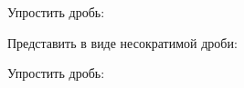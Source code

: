 \begin{listofex}
	\item Упростить дробь:
	\begin{enumcols}[itemcolumns=2]
		\item {}
		\item {}
		\item {}
		\item {}
		\item {}
		\item {}
	\end{enumcols}
	\item {}
	\item Представить в виде несократимой дроби:
	\begin{enumcols}[itemcolumns=2]
		\item {}
		\item {}
		\item {}
	\end{enumcols}
	\item Упростить дробь:
	\begin{enumcols}[itemcolumns=2]
		\item {}
		\item {}
		\item {}
		\item {}
		\item {}
		\item {}
	\end{enumcols}
	
\end{listofex}
\newpage


